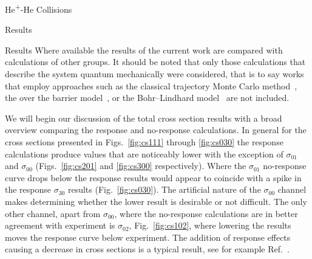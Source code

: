 \documentclass[letterpaper, 11 pt]{report}
\begin{document}
\begin{chapter}{\texorpdfstring{He\textsuperscript{+}}{He+}-He Collisions \label{chap:hephe}}
\begin{section}{Results \label{sec:hephe-disc}}
\begin{subsection}{Results \label{sec:hephe-res}}
         Where available the results of the current work are compared with calculations of other groups.
         It should be noted that only those calculations that describe the system quantum mechanically
         were considered, that is to say works that employ approaches such as the classical trajectory
         Monte Carlo method~\cite{GMZ17}, the over the barrier model~\cite{CC-07}, or the Bohr–Lindhard
         model~\cite{DYC-08, DLZ-12} are not included.

         We will begin our discussion of the total cross section results with a broad overview comparing
         the response and no-response calculations. In general for the cross sections presented in
         Figs.~\ref{fig:cs111} through \ref{fig:cs030} the response calculations produce values that are
         noticeably lower with the exception of $\sigma_{01}$ and $\sigma_{00}$ (Figs.~\ref{fig:cs201}
         and \ref{fig:cs300} respectively). Where the $\sigma_{01}$ no-response curve drops below the
         response results would appear to coincide with a spike in the response $\sigma_{30}$ results
         (Fig.~\ref{fig:cs030}). The artificial nature of the $\sigma_{00}$ channel makes determining
         whether the lower result is desirable or not difficult. The only other channel, apart from
         $\sigma_{00}$, where the no-response calculations are in better agreement with experiment is
         $\sigma_{02}$, Fig.~\ref{fig:cs102}, where lowering the results moves the response curve below
         experiment. The addition of response effects causing a decrease in cross sections is a typical
         result, see for example Ref.~\cite{microresp}.


\end{subsection}
\end{section}
\end{chapter}
\end{document}
